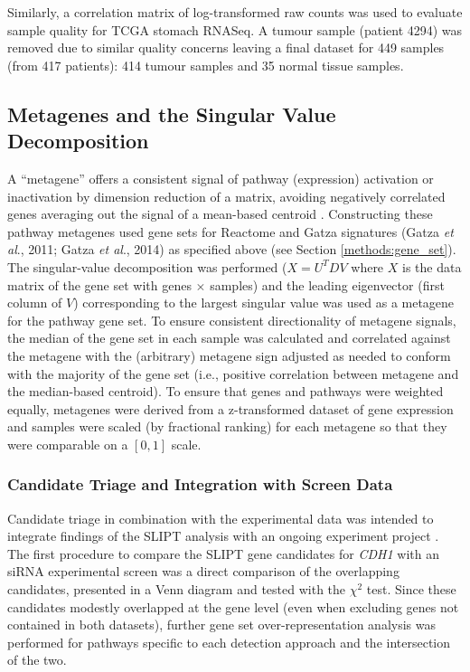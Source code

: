 Similarly, a correlation matrix of log-transformed raw counts was used to evaluate sample quality for TCGA stomach RNASeq. A tumour sample (patient 4294) was removed due to similar quality concerns leaving a final dataset for 449 samples (from 417 patients): 414 tumour samples and 35 normal tissue samples.

\subsection{Metagenes and the Singular Value Decomposition} \label{methods:metagene}
A ``metagene'' offers a consistent signal of pathway (expression) activation or inactivation by dimension reduction of a matrix, avoiding negatively correlated genes averaging out the signal of a mean-based centroid \citep{Huang2003}. Constructing these pathway metagenes used gene sets for Reactome and Gatza signatures (Gatza \textit{et al}., 2011; Gatza \textit{et al}., 2014) as specified above (see Section \ref{methods:gene_set}). The singular-value decomposition was performed ($X = U^{T} D V$ where $X$ is the data matrix of the gene set with genes $\times$ samples) and the leading eigenvector (first column of $V$) corresponding to the largest singular value was used as a metagene for the pathway gene set. To ensure consistent directionality of metagene signals, the median of the gene set in each sample was calculated and correlated against the metagene with the (arbitrary) metagene sign adjusted as needed to conform with the majority of the gene set (i.e., positive correlation between metagene and the median-based centroid). To ensure that genes and pathways were weighted equally, metagenes were derived from a z-transformed dataset of gene expression and samples were scaled (by fractional ranking) for each metagene so that they were comparable on a $[0,1]$ scale. 

\subsubsection{Candidate Triage and Integration with Screen Data} \label{methods:venn_analysis}
Candidate triage in combination with the experimental data was intended to integrate findings of the SLIPT analysis with an ongoing experiment project \citep{Chen2014, Telford2015}. The first procedure to compare the SLIPT gene candidates for \textit{CDH1} with an siRNA experimental screen \citep{Telford2015} was a direct comparison of the overlapping candidates, presented in a Venn diagram and tested with the $\chi^2$ test. Since these candidates modestly overlapped at the gene level (even when excluding genes not contained in both datasets), further gene set over-representation analysis was performed for pathways specific to each detection approach and the intersection of the two.


